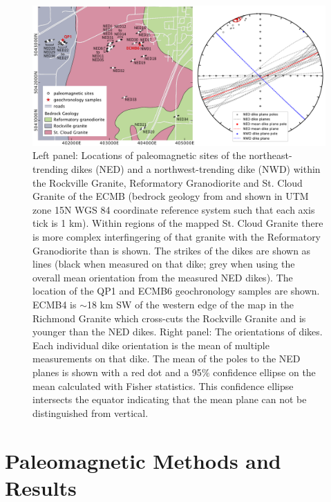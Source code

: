 \documentclass[draft]{agujournal2019}
\begin{document}
\begin{figure}[!ht]
\centering
\noindent\includegraphics[width=\textwidth]{./figures/map_sites.pdf}
\caption{\small{Left panel: Locations of paleomagnetic sites of the northeast-trending dikes (NED) and a northwest-trending dike (NWD) within the Rockville Granite, Reformatory Granodiorite and St. Cloud Granite of the ECMB (bedrock geology from  and shown in UTM zone 15N WGS 84 coordinate reference system such that each axis tick is 1 km). Within regions of the mapped St. Cloud Granite there is more complex interfingering of that granite with the Reformatory Granodiorite than is shown. The strikes of the dikes are shown as lines (black when measured on that dike; grey when using the overall mean orientation from the measured NED dikes). The location of the QP1 and ECMB6 geochronology samples are shown. ECMB4 is $\sim$18 km SW of the western edge of the map in the Richmond Granite which cross-cuts the Rockville Granite and is younger than the NED dikes. Right panel: The orientations of dikes. Each individual dike orientation is the mean of multiple measurements on that dike. The mean of the poles to the NED planes is shown with a red dot and a 95$\%$ confidence ellipse on the mean calculated with Fisher statistics. This confidence ellipse intersects the equator indicating that the mean plane can not be distinguished from vertical.}}
\label{fig:site_map}
\end{figure}

\section*{Paleomagnetic Methods and Results}
\end{document}
